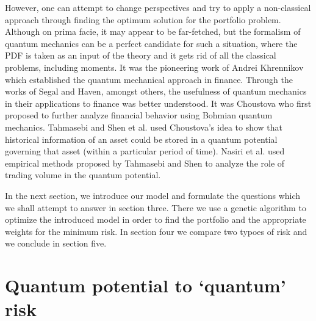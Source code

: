 \documentclass[ aip,jmp,reprint]{revtex4-2}
\begin{document}
However, one can attempt to change perspectives and try to apply a
non-classical approach through finding the optimum solution for the
portfolio problem. Although on prima facie, it may appear to be far-fetched,
but the formalism of quantum mechanics can be a perfect candidate for such a
situation, where the PDF is taken as an input of the theory and it gets rid
of all the classical problems, including moments. It was the pioneering work
of Andrei Khrennikov\cite{Khrennivov1} which established the quantum
mechanical approach in finance. Through the works of Segal\cite{Segal} and
Haven\cite{Haven2}, amongst others, the usefulness of quantum mechanics in
their applications to finance was better understood. It was Choustova\cite%
{Choustova1} who first proposed to further analyze financial behavior using
Bohmian quantum mechanics. Tahmasebi\cite{Tahmasebi} and Shen et al.\cite%
{Shen} used Choustova's idea to show that historical information of an asset
could be stored in a quantum potential governing that asset (within a
particular period of time). Nasiri et al.\cite{Nasiri1,Nasiri2} used
empirical methods proposed by Tahmasebi and Shen to analyze the role of
trading volume in the quantum potential.

In the next section, we introduce our model and formulate the questions
which we shall attempt to answer in section three. There we use a genetic
algorithm to optimize the introduced model in order to find the portfolio
and the appropriate weights for the minimum risk. In section four we compare
two typoes of risk and we conclude in section five.

\section{Quantum potential to `quantum' risk}
\end{document}
